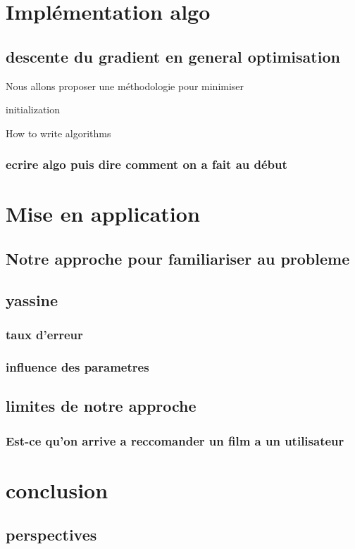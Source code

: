 \documentclass[a4paper,10pt]{article}
\begin{document}
\section{Implémentation algo}
\subsection{descente du gradient en general optimisation}
Nous allons proposer une méthodologie pour minimiser 
\begin{algorithm}[H]
 initialization\;
 \caption{How to write algorithms}
\end{algorithm}
\subsubsection{ecrire algo puis dire comment on a fait au début}
\section{Mise en application}
\subsection{Notre approche pour familiariser au probleme}
\subsection{yassine}
\subsubsection{taux d'erreur}
\subsubsection{influence des parametres}
\subsection{limites de notre approche}
\subsubsection{Est-ce qu'on arrive a reccomander un film a un utilisateur}
\section{conclusion}

\subsection{perspectives}
\end{document}
